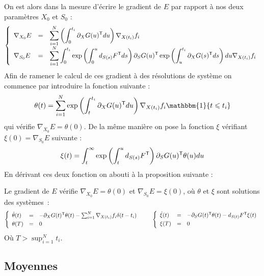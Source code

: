 On est alors dans la mesure d'écrire le gradient de $E$ par rapport à nos deux paramètres $X_0$ et $S_0$ :
\begin{equation}
	\syst{lll}{
		\displaystyle \nabla_{X_0} E & = & \displaystyle \sum_{i=1}^N \left( \int_0^{t_i} \partial_	X G(u)^\trans du \right) \nabla_{X(t_i)} f_i \\
		\displaystyle \nabla_{S_0} E & = & \displaystyle \sum_{i=1}^N \int_0^{t_i} \exp \left( \int_0^u d_{S(s)} F^\trans ds \right) \partial_S G(u)^\trans \exp \left( \int_u^{t_i} \partial_X G(s)^\trans ds \right) du \nabla_{X(t_i)} f_i
	}
\end{equation}
Afin de ramener le calcul de ces gradient à des résolutions de système on commence par introduire la fonction suivante :
\begin{equation}
	\theta(t) = \sum_{i=1}^N \exp \left( \int_t^{t_i} \partial_X G(u)^\trans du \right) \nabla_{X(t_i)} f_i \mathbbm{1} \{ t \leqslant t_i \}
\end{equation}
qui vérifie $\nabla_{X_0} E = \theta(0)$. De la même manière on pose la fonction $\xi$ vérifiant $\xi(0) = \nabla_{S_0} E$ suivante :
\begin{equation}
	\xi(t) = \int_t^\infty \exp \left( \int_t^u d_{S(s)} F^\trans \right) \partial_S G(u)^\trans \theta(u) du
\end{equation}
En dérivant ces deux fonction on abouti à la proposition suivante :

\begin{proposition}
	Le gradient de $E$ vérifie $\nabla_{X_0} E = \theta(0)$ et $\nabla_{S_0} E = \xi(0)$, où $\theta$ et $\xi$ sont solutions des systèmes~:
	\begin{equation}
	\syst{lll}{
		\dot{\theta}(t) & = & - \partial_X G(t)^\trans \theta(t) - \sum_{i=1}^N \nabla_{X(t_i)} f_i \delta (t - t_i) \\[1mm]
		\theta(T) & = & 0
	} \qquad  \syst{lll}{
		\dot{\xi}(t) & = & - \partial_S G(t)^\trans \theta(t) - d_{S(t)} F^\trans \xi(t) \\[1mm]
		\xi(T) & = & 0
	}
	\end{equation}
	Où $T > \sup_{i = 1}^N t_i$.
\end{proposition}

\subsection{Moyennes}

